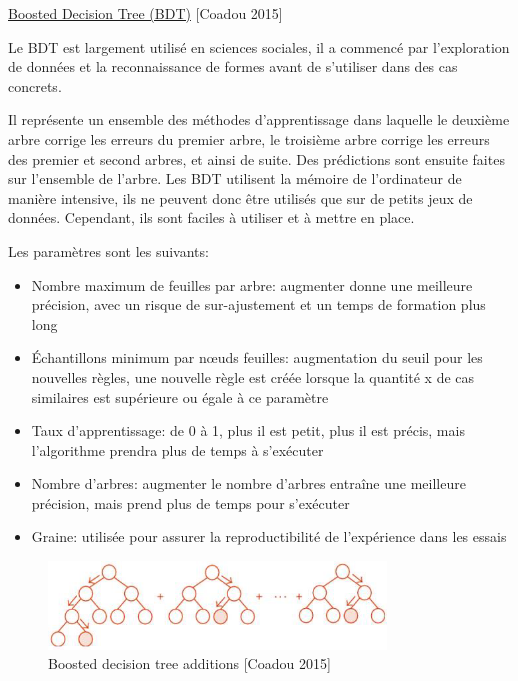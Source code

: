 \documentclass[12pt]{article}
\begin{document}
{%

\underline{ Boosted Decision Tree (BDT)}  {\color{red}[Coadou 2015]}

Le BDT est largement utilisé en sciences sociales, il a commencé par l'exploration de données et la reconnaissance de formes avant de s'utiliser dans des cas concrets.

Il représente un ensemble des méthodes d'apprentissage dans laquelle le deuxième arbre corrige les erreurs du premier arbre, le troisième arbre corrige les erreurs des premier et second arbres, et ainsi de suite. Des prédictions sont ensuite faites sur l'ensemble de l'arbre.
Les BDT utilisent la mémoire de l'ordinateur de manière intensive, ils ne peuvent donc être utilisés que sur de petits jeux de données. Cependant, ils sont faciles à utiliser et à mettre en place.

Les paramètres sont les suivants:

\begin{itemize}
\item Nombre maximum de feuilles par arbre: augmenter donne une meilleure précision, avec un risque de sur-ajustement et un temps de formation plus long
\item Échantillons minimum par nœuds feuilles: augmentation du seuil pour les nouvelles règles, une nouvelle règle est créée lorsque la quantité x de cas similaires est supérieure ou égale à ce paramètre
\item Taux d'apprentissage: de 0 à 1, plus il est petit, plus il est précis, mais l'algorithme prendra plus de temps à s'exécuter
\item Nombre d'arbres: augmenter le nombre d'arbres entraîne une meilleure précision, mais prend plus de temps pour s'exécuter
\item Graine: utilisée pour assurer la reproductibilité de l'expérience dans les essais
\end{itemize}


\begin{figure}[H]
	\centering
    \includegraphics[width=0.8\textwidth]{image13.png}
     \caption{Boosted decision tree additions [Coadou 2015]}
    \label{fig:13}
\end{figure}

}
\end{document}

